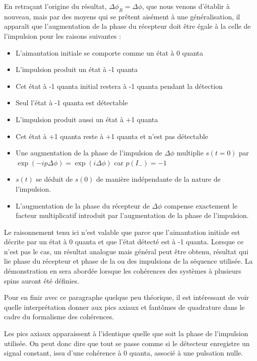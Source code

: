 En retraçant l'origine du résultat, $\Delta\phi_R = \Delta\phi$,
que nous venons d'établir à nouveau, mais par des
moyens qui se prêtent aisément à une généralisation, il apparaît
que l'augmentation de la phase du récepteur doit être égale à la celle
de l'impulsion pour les raisons suivantes :
\begin{itemize}
\item L'aimantation initiale se comporte comme un état à 0 quanta
\item L'impulsion produit un état à -1 quanta
\item Cet état à -1 quanta initial restera à -1 quanta pendant la détection
\item Seul l'état à -1 quanta est détectable
\item L'impulsion produit aussi un état à +1 quanta
\item Cet état à +1 quanta reste à +1 quanta et n'est pas détectable
\item Une augmentation de la phase de l'impulsion de $\Delta\phi$ multiplie $s(t=0)$
par $\exp(-i p \Delta\phi) = \exp(i \Delta\phi)$ car $p(I_-)=-1$
\item $s(t)$ se déduit de $s(0)$ de manière indépendante de la nature de l'impulsion.
\item L'augmentation de la phase du récepteur de $\Delta\phi$ compense exactement
le facteur multiplicatif introduit par l'augmentation de la phase de l'impulsion.
\end{itemize} 

Le raisonnement tenu ici n'est valable que parce que l'aimantation initiale est
décrite par un état à 0 quanta et que l'état détecté est à -1 quanta.
Lorsque ce n'est pas le cas, un résultat analogue mais général peut être obtenu,
résultat qui lie phase du récepteur et phase de la ou des impulsions
de la séquence utilisée.
La démonstration en sera abordée lorsque les cohérences des systèmes
à plusieurs spins auront été définies.

Pour en finir avec ce paragraphe quelque peu théorique,
il est intéressant de voir quelle interprétation donner aux
pics axiaux et fantômes de quadrature dans le cadre du formalisme des cohérences.

Les pics axiaux apparaissent à l'identique quelle que soit
la phase de l'impulsion utilisée.
On peut donc dire que tout se passe comme si le détecteur enregistre
un signal constant, issu d'une cohérence à 0 quanta, associé à une pulsation nulle.

